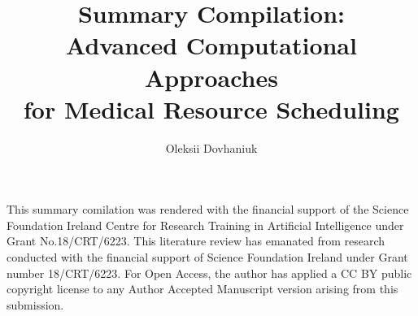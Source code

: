 \title{ 
	Summary Compilation: \\[-.65em]
	Advanced Computational Approaches \\[0.3em] 
	for Medical Resource Scheduling
}
\author{Oleksii Dovhaniuk}

\maketitle
\makedeclaration
\begin{acknowledgements}
	
	This summary comilation was rendered with the financial support of the Science Foundation Ireland Centre for Research Training in Artificial Intelligence under Grant No.18/CRT/6223. This literature review has emanated from research conducted with the financial support of Science Foundation Ireland under Grant number 18/CRT/6223. For Open Access, the author has applied a CC BY public copyright license to any Author Accepted Manuscript version arising from this submission.

\end{acknowledgements}

\setcounter{tocdepth}{2} 


\tableofcontents

